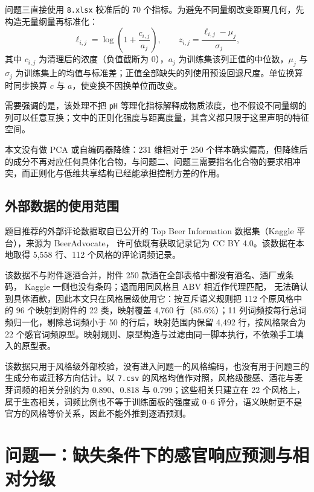 \documentclass[UTF8,a4paper,zihao=-4]{ctexart}
\numberwithin{figure}{section}
\numberwithin{table}{section}
\numberwithin{equation}{section}
\newcommand{\file}[1]{\texttt{#1}}
\begin{document}
问题三直接使用 \file{8.xlsx} 校准后的 70 个指标。为避免不同量纲改变距离几何，先构造无量纲量再标准化：
\begin{equation}
\ell_{i,j}=\log\left(1+\frac{c_{i,j}}{a_{j}}\right),\qquad
z_{i,j}=\frac{\ell_{i,j}-\mu_{j}}{\sigma_{j}},
\label{eq:q3scale}
\end{equation}
其中 $c_{i,j}$ 为清理后的浓度（负值截断为 0），$a_j$ 为训练集该列正值的中位数，$\mu_j$ 与 $\sigma_j$ 为训练集上的均值与标准差；正值全部缺失的列使用预设回退尺度。单位换算时同步换算 $c$ 与 $a$，使变换不因换单位而改变。

需要强调的是，该处理不把 \file{pH} 等理化指标解释成物质浓度，也不假设不同量纲的列可以任意互换；文中的正则化强度与距离度量，其含义都只限于这里声明的特征空间。

本文没有做 PCA 或自编码器降维：231 维相对于 250 个样本确实偏高，但降维后的成分不再对应任何具体化合物，与问题二、问题三需要指名化合物的要求相冲突，而正则化与低维共享结构已经能承担控制方差的作用。

\subsection{外部数据的使用范围}

题目推荐的外部评论数据取自已公开的 Top Beer Information 数据集（Kaggle 平台），来源为 BeerAdvocate，
许可依既有获取记录记为 CC BY 4.0。该数据在本地取得 5{,}558 行、112 个风格的评论词频记录。

该数据不与附件逐酒合并，附件 250 款酒在全部表格中都没有酒名、酒厂或条码，
Kaggle 一侧也没有条码；退而用同风格且 ABV 相近作代理匹配，
无法确认到具体酒款，因此本文只在风格层级使用它：按互斥语义规则把 112 个原风格中的 96 个映射到附件的 22 类，映射覆盖 4{,}760 行（85.6\%）；11 列词频按每行总词频归一化，剔除总词频小于 50 的行后，映射范围内保留 4{,}492 行，按风格聚合为 22 个感官词频原型。映射规则、原型构造与过滤由同一脚本执行，不依赖手工填入的原型表。

该数据只用于风格级外部校验，没有进入问题一的风格编码，也没有用于问题三的生成分布或迁移方向估计。以 \file{7.csv} 的风格均值作对照，风格级酸感、酒花与麦芽词频的相关分别约为 0.890、0.818 与 0.799；这些相关只建立在 22 个风格上，属于生态相关，词频比例也不等于训练面板的强度或 0--6 评分，语义映射更不是官方的风格等价关系，因此不能外推到逐酒预测。

\section{问题一：缺失条件下的感官响应预测与相对分级}
\label{sec:q1}
\end{document}
